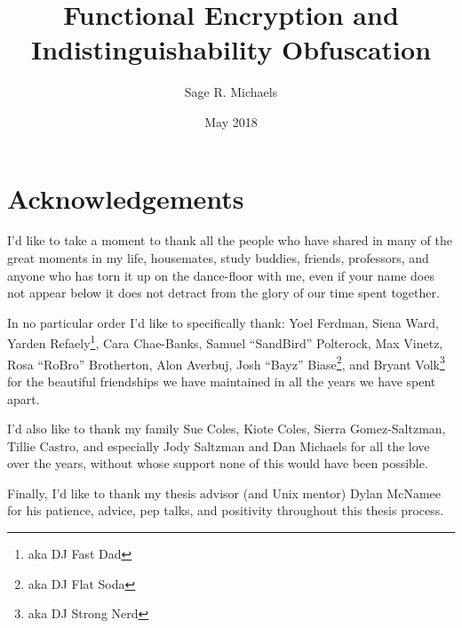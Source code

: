 \documentclass[12pt,twoside]{reedthesis}
\title{Functional Encryption and Indistinguishability Obfuscation}
\author{Sage R. Michaels}
\date{May 2018}
\begin{document}
  \maketitle
  \frontmatter %
  \pagestyle{empty} %

    \chapter*{Acknowledgements}
	
		
	I'd like to take a moment to thank all the people who have shared in many of the great moments in my life, housemates, study buddies, friends, professors, and anyone who has torn it up on the dance-floor with me, even if your name does not appear below it does not detract from the glory of our time spent together. 
	\par In no particular order I'd like to specifically thank: Yoel Ferdman,  Siena Ward, Yarden Refaely\footnote{aka DJ Fast Dad}, Cara Chae-Banks, Samuel ``SandBird'' Polterock, Max Vinetz, Rosa ``RoBro'' Brotherton, Alon Averbuj, Josh ``Bayz'' Biase\footnote{aka DJ Flat Soda}, and Bryant Volk\footnote{aka DJ Strong Nerd} for the beautiful friendships we have maintained in all the years we have spent apart.  	
	\par I'd also like to thank my family Sue Coles, Kiote Coles, Sierra Gomez-Saltzman, Tillie Castro, and especially Jody Saltzman and Dan Michaels for all the love over the years, without whose support none of this would have been possible.
	\par Finally, I'd like to thank my thesis advisor (and Unix mentor) Dylan McNamee for his patience, advice, pep talks, and positivity throughout this thesis process. 


\end{document}
